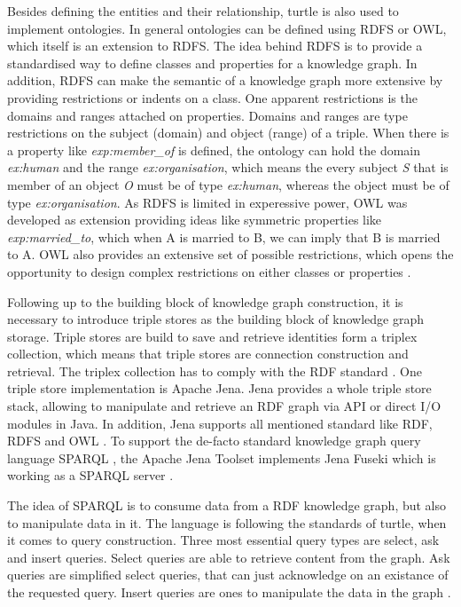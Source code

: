 \documentclass[a4paper,oneside,bibliography=totoc]{scrbook}
\begin{document}
Besides defining the entities and their relationship, turtle is also used to implement ontologies. In general ontologies can be defined using \ac{RDFS} or \ac{OWL}, which itself is an extension to \ac{RDFS}. The idea behind \ac{RDFS} is to provide a standardised way to define classes and properties for a knowledge graph. In addition, \ac{RDFS} can make the semantic of a knowledge graph more extensive by providing restrictions or indents on a class. One apparent restrictions is the domains and ranges attached on properties. Domains and ranges are type restrictions on the subject (domain) and object (range) of a triple. When there is a property like \textit{exp:member\_of} is defined, the ontology can hold the domain \textit{ex:human} and the range \textit{ex:organisation}, which means the every subject \textit{S} that is member of an object \textit{O} must be of type \textit{ex:human}, whereas the object must be of type \textit{ex:organisation}. As \ac{RDFS} is limited in experessive power, \ac{OWL} was developed as extension providing ideas like symmetric properties like \textit{exp:married\_to}, which when A is married to B, we can imply that B is married to A. \ac{OWL} also provides an extensive set of possible restrictions, which opens the opportunity to design complex restrictions on either classes or properties \cite{VillazonTerrazas2017}.

Following up to the building block of knowledge graph construction, it is necessary to introduce triple stores as the building block of knowledge graph storage. Triple stores are build to save and retrieve identities form a triplex collection, which means that triple stores are connection construction and retrieval. The triplex collection has to comply with the \ac{RDF} standard \cite{Rusher2003}. One triple store implementation is Apache Jena. Jena provides a whole triple store stack, allowing to manipulate and retrieve an \ac{RDF} graph via API or direct I/O modules in Java. In addition, Jena supports all mentioned standard like \ac{RDF}, \ac{RDFS} and \ac{OWL} \cite{Carroll2004}. To support the de-facto standard knowledge graph query language \ac{SPARQL} \cite{VillazonTerrazas2017}, the Apache Jena Toolset implements Jena Fuseki which is working as a \ac{SPARQL} server \cite{Chokshi2022}.

The idea of \ac{SPARQL} is to consume data from a \ac{RDF} knowledge graph, but also to manipulate data in it. The language is following the standards of turtle, when it comes to query construction. Three most essential query types are select, ask and insert queries. Select queries are able to retrieve content from the graph. Ask queries are simplified select queries, that can just acknowledge on an existance of the requested query. Insert queries are ones to manipulate the data in the graph \cite{VillazonTerrazas2017}.
\end{document}
